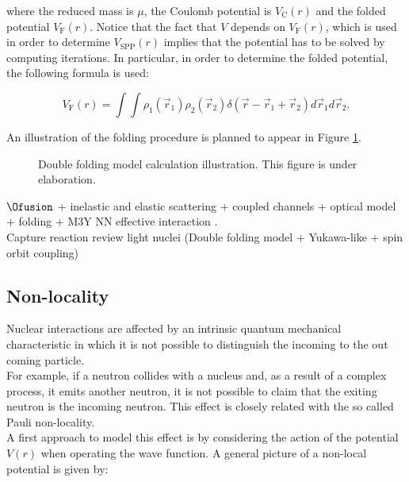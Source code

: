 \documentclass[openany]{book}
\begin{document}
where the reduced mass is $\mu$, the Coulomb potential is $V_{\mathrm{C}}(r)$ and the folded potential  $V_{\mathrm{F}}(r)$. Notice that the fact that $V$ depends on $V_{\mathrm{F}}(r)$, which is used in order to determine $V_{\mathrm{SPP}} (r)$ implies that the potential has to be solved by computing iterations. In particular, in order to determine the folded potential, the following formula is used:  

\begin{equation} \label{eq:potential_SaoPaulo_folding}
	V_{\mathrm{F}}(r) = \int \int \rho_1(\vec r_1)  \rho_2(\vec r_2) \delta(\vec r - \vec r_1 +  \vec r_2) {d\vec{r}_1}  {d\vec{r}_2}.
\end{equation}

An illustration of the folding procedure is planned to appear in Figure \ref{fig:DoubleFolding}.

\begin{figure}[H]
	
	\caption[Double folding model calculation illustration]{Double folding model calculation illustration. This figure is under elaboration.}
	\label{fig:DoubleFolding}
\end{figure}

$\Ofusion$ + inelastic and elastic scattering + coupled channels + optical model + folding + M3Y NN effective interaction \cite{hassanain_al_sebiey_2014}.  \\

Capture reaction review light nuclei (Double folding model + Yukawa-like + spin orbit coupling)\cite{ghasemi_sadeghi_2018}

\subsection{Non-locality}  \label{sub:potential_nonlocality}

Nuclear interactions are affected by an intrinsic quantum mechanical characteristic in which it is not possible to distinguish the incoming to the out coming particle. \\

For example, if a neutron collides with a nucleus and, as a result of a complex process, it emits another neutron, it is not possible to claim that the exiting neutron is the incoming neutron.  This effect is closely related with the so called Pauli non-locality. \\

A first approach to model this effect is by considering the action of the potential $V(r)$ when operating the wave function. A general picture of a non-local potential is given by:
\end{document}
